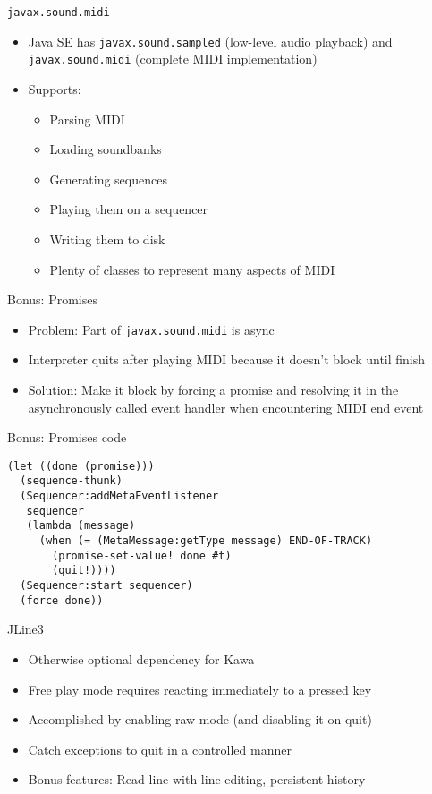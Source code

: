 \documentclass[presentation]{beamer}
\begin{document}
\begin{frame}[fragile,label=sec-2-3]{\texttt{javax.sound.midi}}
 \begin{itemize}
\item Java SE has \texttt{javax.sound.sampled} (low-level audio playback) and
\texttt{javax.sound.midi} (complete MIDI implementation)
\item Supports:
\begin{itemize}
\item Parsing MIDI
\item Loading soundbanks
\item Generating sequences
\item Playing them on a sequencer
\item Writing them to disk
\item Plenty of classes to represent many aspects of MIDI
\end{itemize}
\end{itemize}
\end{frame}

\begin{frame}[fragile,label=sec-2-4]{Bonus: Promises}
 \begin{itemize}
\item Problem: Part of \texttt{javax.sound.midi} is async
\item Interpreter quits after playing MIDI because it doesn't block until
finish
\item Solution: Make it block by forcing a promise and resolving it in the
asynchronously called event handler when encountering MIDI end event
\end{itemize}
\end{frame}

\begin{frame}[fragile,label=sec-2-5]{Bonus: Promises code}
 \begin{verbatim}
(let ((done (promise)))
  (sequence-thunk)
  (Sequencer:addMetaEventListener
   sequencer
   (lambda (message)
     (when (= (MetaMessage:getType message) END-OF-TRACK)
       (promise-set-value! done #t)
       (quit!))))
  (Sequencer:start sequencer)
  (force done))
\end{verbatim}
\end{frame}

\begin{frame}[label=sec-2-6]{JLine3}
\begin{itemize}
\item Otherwise optional dependency for Kawa
\item Free play mode requires reacting immediately to a pressed key
\item Accomplished by enabling raw mode (and disabling it on quit)
\item Catch exceptions to quit in a controlled manner
\item Bonus features: Read line with line editing, persistent history
\end{itemize}
\end{frame}
\end{document}
